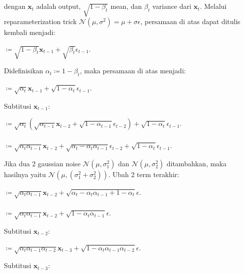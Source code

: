 \documentclass{article}
\begin{document}
\\\\
dengan $ \textbf{x}_{t} $ adalah output, $ \sqrt{1-\beta_t} $ mean, dan $ \beta_t $ variance dari $ \textbf{x}_{t} $. Melalui reparameterization trick $ \mathscr{N}(\mu,\sigma^2) = \mu + \sigma \epsilon $, persamaan di atas dapat ditulis kembali menjadi:
\begin{tabbing} 
\hspace{4.75em} $ \coloneq \sqrt{1-\beta_t}\textbf{x}_{t-1} + \sqrt{\beta_t}\epsilon_{t-1} $.
\end{tabbing}
Didefinisikan $ \alpha_t \coloneq 1 - \beta_t $, maka persamaan di atas menjadi:
\begin{tabbing} 
\hspace{4.75em} $ \coloneq \sqrt{\alpha_t}\textbf{x}_{t-1} + \sqrt{1-\alpha_t}\epsilon_{t-1} $.
\end{tabbing}
Subtitusi $ \textbf{x}_{t-1} $:
\begin{tabbing} 
\hspace{4.75em} $ \coloneq \sqrt{\alpha_t} (\sqrt{\alpha_{t-1}} \textbf{x}_{t-2} + \sqrt{1-\alpha_{t-1}} \epsilon_{t-2}) + \sqrt{1-\alpha_t}\epsilon_{t-1} $.
\\\\
\hspace{4.75em} $ \coloneq \sqrt{\alpha_t \alpha_{t-1}} \textbf{x}_{t-2} + \sqrt{\alpha_t - \alpha_t\alpha_{t-1}} \epsilon_{t-2} + \sqrt{1-\alpha_t}\epsilon_{t-1} $.
\end{tabbing}
Jika dua 2 gaussian noise $ \mathscr{N}(\mu,\sigma_1^2) $ dan $ \mathscr{N}(\mu,\sigma_2^2) $ ditambahkan, maka hasilnya yaitu $ \mathscr{N}(\mu,(\sigma_1^2 + \sigma_2^2)) $. Ubah 2 term terakhir:
\begin{tabbing} 
\hspace{4.75em} $ \coloneq \sqrt{\alpha_t \alpha_{t-1}} \textbf{x}_{t-2} + \sqrt{\alpha_t - \alpha_t\alpha_{t-1} + 1-\alpha_t} \epsilon $.
\\\\
\hspace{4.75em} $ \coloneq \sqrt{\alpha_t \alpha_{t-1}} \textbf{x}_{t-2} + \sqrt{1-\alpha_t\alpha_{t-1}} \epsilon $.
\end{tabbing}
Subtitusi $ \textbf{x}_{t-2} $:
\begin{tabbing} 
\hspace{4.75em} $ \coloneq \sqrt{\alpha_t \alpha_{t-1} \alpha_{t-2}} \textbf{x}_{t-3} + \sqrt{1-\alpha_t\alpha_{t-1}\alpha_{t-2}} \epsilon $.
\end{tabbing}
Subtitusi $ \textbf{x}_{t-3} $:
\end{document}
